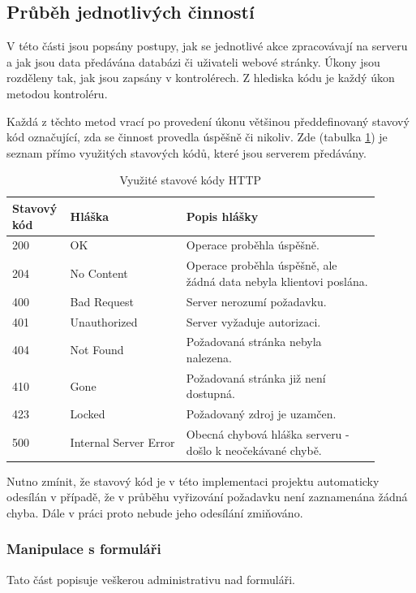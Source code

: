 	\subsection{Průběh jednotlivých činností}
	V této části jsou popsány postupy, jak se jednotlivé akce zpracovávají na serveru a jak jsou data předávána databázi či uživateli webové stránky. Úkony jsou rozděleny tak, jak jsou zapsány v kontrolérech. Z hlediska kódu je každý úkon metodou kontroléru.
	
	Každá z těchto metod vrací po provedení úkonu většinou předdefinovaný stavový kód označující, zda se činnost provedla úspěšně či nikoliv. Zde (tabulka \ref{tab:http_stavove_kody}) je seznam přímo využitých stavových kódů, které jsou serverem předávány.
	
	\begin{table}[H]
		\centering
		\begin{tabular}{ | p{0.1\linewidth} | p{0.3\linewidth} |  p{0.5\linewidth} |} 
			\hline
			\textbf{Stavový kód} & \textbf{Hláška} & \textbf{Popis hlášky} \\ 
			\hline
			200 & OK & Operace proběhla úspěšně. \\
			\hline
			204 & No Content & Operace proběhla úspěšně, ale žádná data nebyla klientovi poslána. \\
			\hline
			400 & Bad Request & Server nerozumí požadavku. \\
			\hline
			401 & Unauthorized & Server vyžaduje autorizaci. \\
			\hline
			404 & Not Found & Požadovaná stránka nebyla nalezena. \\
			\hline
			410 & Gone & Požadovaná stránka již není dostupná. \\
			\hline
			423 & Locked & Požadovaný zdroj je uzamčen. \\
			\hline
			500 & Internal Server Error & Obecná chybová hláška serveru - došlo k neočekávané chybě. \\
			\hline
		\end{tabular}
		\caption{Využité stavové kódy HTTP \cite{HTTPKody1} \cite{HTTPKody2}}
		\label{tab:http_stavove_kody}
	\end{table}

	Nutno zmínit, že stavový kód  je v této implementaci projektu automaticky odesílán v případě, že v průběhu vyřizování požadavku není zaznamenána žádná chyba. Dále v práci proto nebude jeho odesílání zmiňováno.
	
		\subsubsection{Manipulace s formuláři}
		Tato část popisuje veškerou administrativu nad formuláři.
		
